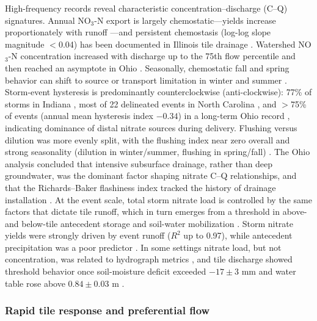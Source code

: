 High-frequency records reveal characteristic concentration--discharge (C--Q) signatures. Annual NO$_3$-N export is largely chemostatic---yields increase proportionately with runoff \parencite{Speir2021}---and persistent chemostasis (log-log slope magnitude $<$0.04) has been documented in Illinois tile drainage \parencite{Hu2024}. Watershed NO$_3$-N concentration increased with discharge up to the 75th flow percentile and then reached an asymptote in Ohio \parencite{Williams2015}. Seasonally, chemostatic fall and spring behavior can shift to source or transport limitation in winter and summer \parencite{Speir2021}. Storm-event hysteresis is predominantly counterclockwise (anti-clockwise): 77\% of storms in Indiana \parencite{Speir2021}, most of 22 delineated events in North Carolina \parencite{Liu2020}, and $>$75\% of events (annual mean hysteresis index $-0.34$) in a long-term Ohio record \parencite{Liu2022b}, indicating dominance of distal nitrate sources during delivery. Flushing versus dilution was more evenly split, with the flushing index near zero overall and strong seasonality (dilution in winter/summer, flushing in spring/fall) \parencite{Liu2022b,Speir2021}. The Ohio analysis concluded that intensive subsurface drainage, rather than deep groundwater, was the dominant factor shaping nitrate C--Q relationships, and that the Richards--Baker flashiness index tracked the history of drainage installation \parencite{Liu2022b}. At the event scale, total storm nitrate load is controlled by the same factors that dictate tile runoff, which in turn emerges from a threshold in above- and below-tile antecedent storage and soil-water mobilization \parencite{Cain2022}. Storm nitrate yields were strongly driven by event runoff ($R^2$ up to 0.97), while antecedent precipitation was a poor predictor \parencite{Speir2021}. In some settings nitrate load, but not concentration, was related to hydrograph metrics \parencite{Williams2022}, and tile discharge showed threshold behavior once soil-moisture deficit exceeded $-17\pm3$ mm and water table rose above $0.84\pm0.03$ m \parencite{Williams2022}.

\subsubsection{Rapid tile response and preferential flow}


